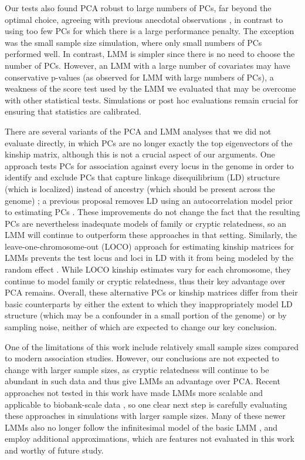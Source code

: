 \documentclass[11pt]{article}
\begin{document}
\begin{linenumbers}
Our tests also found PCA robust to large numbers of PCs, far beyond the optimal choice, agreeing with previous anecdotal observations \citep{price_principal_2006, kang_variance_2010}, in contrast to using too few PCs for which there is a large performance penalty.
The exception was the small sample size simulation, where only small numbers of PCs performed well.
In contrast, LMM is simpler since there is no need to choose the number of PCs.
However, an LMM with a large number of covariates may have conservative p-values (as observed for LMM with large numbers of PCs), a weakness of the score test used by the LMM we evaluated that may be overcome with other statistical tests.
Simulations or post hoc evaluations remain crucial for ensuring that statistics are calibrated.

There are several variants of the PCA and LMM analyses that we did not evaluate directly, in which PCs are no longer exactly the top eigenvectors of the kinship matrix, although this is not a crucial aspect of our arguments.
One approach tests PCs for association against every locus in the genome in order to identify and exclude PCs that capture linkage disequilibrium (LD) structure (which is localized) instead of ancestry (which should be present across the genome) \citep{prive_efficient_2020}; a previous proposal removes LD using an autocorrelation model prior to estimating PCs \citep{patterson_population_2006}.
These improvements do not change the fact that the resulting PCs are nevertheless inadequate models of family or cryptic relatedness, so an LMM will continue to outperform these approaches in that setting.
Similarly, the leave-one-chromosome-out (LOCO) approach for estimating kinship matrices for LMMs prevents the test locus and loci in LD with it from being modeled by the random effect \citep{lippert_fast_2011, yang_advantages_2014}.
While LOCO kinship estimates vary for each chromosome, they continue to model family or cryptic relatedness, thus their key advantage over PCA remains.
Overall, these alternative PCs or kinship matrices differ from their basic counterparts by either the extent to which they inappropriately model LD structure (which may be a confounder in a small portion of the genome) or by sampling noise, neither of which are expected to change our key conclusion.

One of the limitations of this work include relatively small sample sizes compared to modern association studies.
However, our conclusions are not expected to change with larger sample sizes, as cryptic relatedness will continue to be abundant in such data and thus give LMMs an advantage over PCA.
Recent approaches not tested in this work have made LMMs more scalable and applicable to biobank-scale data \citep{loh_efficient_2015, zhou_efficiently_2018, mbatchou_computationally_2021}, so one clear next step is carefully evaluating these approaches in simulations with larger sample sizes.
Many of these newer LMMs also no longer follow the infinitesimal model of the basic LMM \citep{loh_efficient_2015, mbatchou_computationally_2021}, and employ additional approximations, which are features not evaluated in this work and worthy of future study.


\end{linenumbers}
\end{document}
